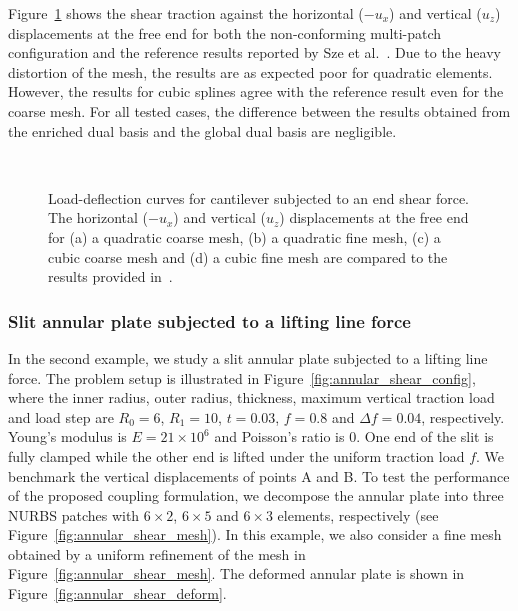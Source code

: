 Figure~\ref{fig:cantilever_shear_result} shows the shear traction against the horizontal ($-u_x$) and vertical ($u_z$) displacements at the free end for both the non-conforming multi-patch configuration and the reference results reported by Sze et al.~\cite{sze2004popular}. Due to the heavy distortion of the mesh, the results are as expected poor for quadratic elements. However, the results for cubic splines agree with the reference result even for the coarse mesh. For all tested cases, the difference between the results obtained from the enriched \Bezier dual basis and the global dual basis are negligible.

\begin{figure}[h]
	\center
	\begin{subfigure}[b]{0.47\textwidth}
		\centering
		
		\caption{}
	\end{subfigure}
	\begin{subfigure}[b]{0.47\textwidth}
		\centering
		
		\caption{}
	\end{subfigure}
	\\
	\begin{subfigure}[b]{0.47\textwidth}
		\centering
		
		\caption{}
	\end{subfigure}
	\begin{subfigure}[b]{0.47\textwidth}
		\centering
		
		\caption{}
	\end{subfigure}
	\caption{Load-deflection curves for cantilever subjected to an end shear force. The horizontal ($-u_x$) and vertical ($u_z$) displacements at the free end for (a) a quadratic coarse mesh, (b) a quadratic fine mesh, (c) a cubic coarse mesh and (d) a cubic fine mesh are compared to the results provided in~\cite{sze2004popular}. }
	\label{fig:cantilever_shear_result}
\end{figure}
\FloatBarrier
\subsubsection{Slit annular plate subjected to a lifting line force}

In the second example, we study a slit annular plate subjected to a lifting line force. The problem setup is illustrated in Figure~\ref{fig:annular_shear_config}, where the inner radius, outer radius, thickness, maximum vertical traction load and load step are $R_0 = 6$, $R_1 = 10$, $t = 0.03$, $f = 0.8$ and $\Delta f = 0.04$, respectively. Young's modulus is $E = 21\times 10^6$ and Poisson's ratio is $0$. One end of the slit is fully clamped while the other end is lifted under the uniform traction load $f$. We benchmark the vertical displacements of points A and B. To test the performance of the proposed coupling formulation, we decompose the annular plate into three NURBS patches with $6\times 2$, $6\times 5$ and $6\times 3$ elements, respectively (see Figure~\ref{fig:annular_shear_mesh}). In this example, we also consider a fine mesh obtained by a uniform refinement of the mesh in Figure~\ref{fig:annular_shear_mesh}. The deformed annular plate is shown in Figure~\ref{fig:annular_shear_deform}.

